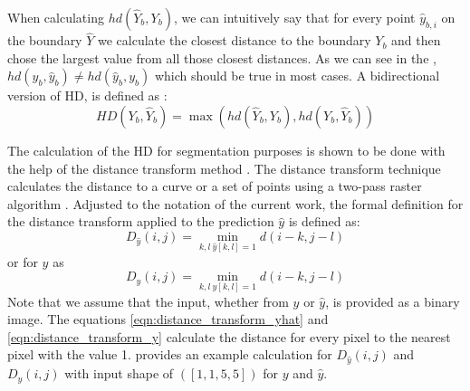 When calculating $hd(\hat{Y}_b,Y_b)$, we can intuitively say that for every point $\hat{y}_{b,i}$ on the boundary $\hat{Y}$ we calculate the closest distance to the boundary $Y_b$ and then chose the largest value from all those closest distances. As we can see in the , $hd(y_b,\hat{y}_b)\neq hd(\hat{y}_b,y_b)$ which should be true in most cases. A bidirectional version of \ac{HD}, is defined as \cite{8767031}:
\begin{equation}
    HD(Y_b,\hat{Y}_b)=\max(hd(\hat{Y}_b,Y_b),hd(Y_b,\hat{Y}_b))
    \label{eqn:hd_bidirectional}
\end{equation}

The calculation of the \ac{HD} for segmentation purposes is shown to be done with the help of the distance transform method \cite{8767031}. The distance transform technique calculates the distance to a curve or a set of points using a two-pass raster algorithm \cite{szeliski2022computer}. Adjusted to the notation of the current work, the formal definition for the distance transform applied to the prediction $\hat{y}$ is defined as:
\begin{equation}
    D_{\hat{y}}(i,j)=\mathop{\min}_{k,l\:\hat{y}[k,l]=1} d(i-k,j-l)
    \label{eqn:distance_transform_yhat}
\end{equation}
or for $y$ as
\begin{equation}
    D_{y}(i,j)=\mathop{\min}_{k,l\:y[k,l]=1} d(i-k,j-l)
    \label{eqn:distance_transform_y}
\end{equation}
Note that we assume that the input, whether from $y$ or $\hat{y}$, is provided as a binary image. The equations \ref{eqn:distance_transform_yhat} and \ref{eqn:distance_transform_y} calculate the distance for every pixel to the nearest pixel with the value 1.  provides an example calculation for $D_{\hat{y}}(i,j)$ and $D_{y}(i,j)$ with input shape of $([1,1,5,5])$ for $y$ and $\hat{y}$.

